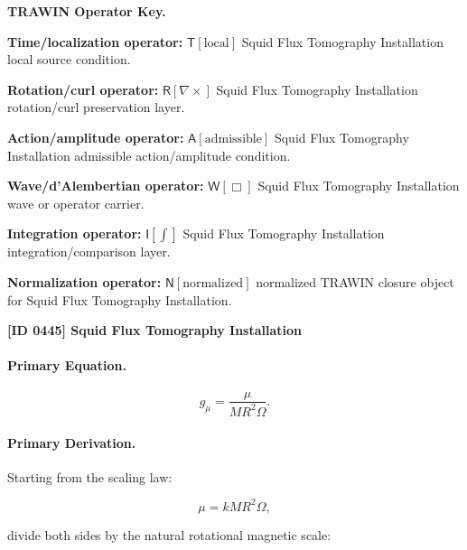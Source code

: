 \par\vspace{0.45\baselineskip}
\noindent\begin{minipage}[t]{\linewidth}
\begingroup
\small
\raggedright
\textbf{TRAWIN Operator Key.}\par
\noindent\textbf{Time/localization operator:} $\mathsf{T}\!\left[\mathrm{local}\right]$ Squid Flux Tomography Installation local source condition.\par
\noindent\textbf{Rotation/curl operator:} $\mathsf{R}\!\left[\nabla\times\right]$ Squid Flux Tomography Installation rotation/curl preservation layer.\par
\noindent\textbf{Action/amplitude operator:} $\mathsf{A}\!\left[\mathrm{admissible}\right]$ Squid Flux Tomography Installation admissible action/amplitude condition.\par
\noindent\textbf{Wave/d'Alembertian operator:} $\mathsf{W}\!\left[\Box\right]$ Squid Flux Tomography Installation wave or operator carrier.\par
\noindent\textbf{Integration operator:} $\mathsf{I}\!\left[\int\right]$ Squid Flux Tomography Installation integration/comparison layer.\par
\noindent\textbf{Normalization operator:} $\mathsf{N}\!\left[\mathrm{normalized}\right]$ normalized TRAWIN closure object for Squid Flux Tomography Installation.\par
\endgroup
\end{minipage}

\clearpage
\noindent\textbf{[ID 0445] Squid Flux Tomography Installation}\par
\vspace{0.35em}
\paragraph{Primary Equation.}
\begin{equation}
g_{\mu}
=
\frac{\mu}
{MR^2\Omega}.
\end{equation}

\paragraph{Primary Derivation.}
Starting from the scaling law:

\begin{equation}
\mu
=
kMR^2\Omega ,
\end{equation}

divide both sides by the natural rotational magnetic scale:

